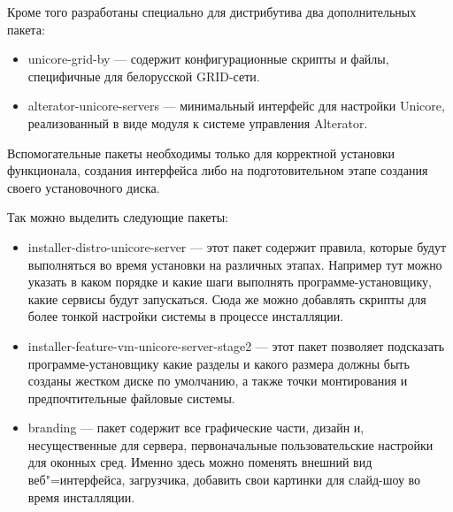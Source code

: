 \documentclass[10pt, a5paper]{article}
\begin{document}
Кроме того разработаны специально для дистрибутива два дополнительных пакета:

\begin{itemize}
	\item unicore-grid-by --- содержит конфигурационные скрипты и \linebreak файлы, специфичные для белорусской GRID-сети.
	\item alterator-unicore-servers --- минимальный интерфейс для \linebreak настройки Unicore, реализованный в виде модуля к системе управления Alterator.
\end{itemize}

Вспомогательные пакеты необходимы только для корректной установки функционала, создания интерфейса либо на подготовительном этапе создания своего установочного диска.

Так можно выделить следующие пакеты:
\begin{itemize}
	\item installer-distro-unicore-server --- этот пакет содержит правила, 
		которые будут выполняться во время установки на различных этапах. 
		Например тут можно указать в каком порядке и какие шаги выполнять 
		программе-установщику, какие сервисы будут запускаться. Сюда же можно 
		добавлять скрипты для более тонкой настройки системы в процессе инсталляции.
	\item installer-feature-vm-unicore-server-stage2 --- этот пакет позволяет 
		подсказать программе-установщику какие разделы и какого размера должны 
		быть созданы жестком диске по умолчанию, а также точки монтирования 
		и предпочтительные файловые системы.
	\item branding --- пакет содержит все графические части, дизайн и, 
		несущественные для сервера, первоначальные пользовательские настройки 
		для оконных сред. Именно здесь можно поменять внешний вид веб"=интерфейса, 
		загрузчика, добавить свои картинки для слайд-шоу во время инсталляции.
\end{itemize}
\end{document}
